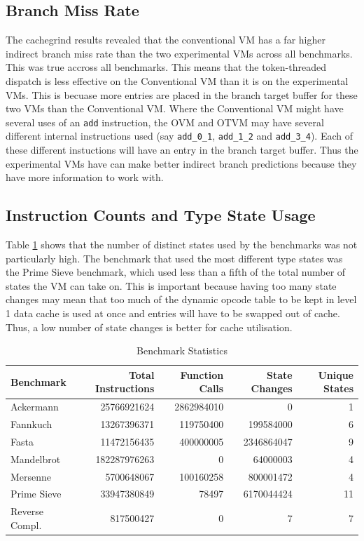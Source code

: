 \documentclass[english,a4paper,12pt]{report}
\begin{document}
\subsection{Branch Miss Rate}
The cachegrind results revealed that the conventional VM has a far
higher indirect branch miss rate than the two experimental VMs across
all benchmarks. This was true accross all benchmarks. This means that
the token-threaded dispatch is less effective on the Conventional VM
than it is on the experimental VMs. This is becuase more entries are
placed in the branch target buffer for these two VMs than the
Conventional VM. Where the Conventional VM might have several uses of
an \verb|add| instruction, the OVM and OTVM may have several different
internal instructions used (say \verb|add_0_1|, \verb|add_1_2| and
\verb|add_3_4|). Each of these different instuctions will have an
entry in the branch target buffer. Thus the experimental VMs have can
make better indirect branch predictions because they have more
information to work with.

\subsection{Instruction Counts and Type State Usage}
Table \ref{tab:stats} shows that the number of distinct states used by
the benchmarks was not particularly high. The benchmark that used the
most different type states was the Prime Sieve benchmark, which used
less than a fifth of the total number of states the VM can take
on. This is important because having too many state changes may mean
that too much of the dynamic opcode table to be kept in level 1 data
cache is used at once and entries will have to be swapped out of
cache. Thus, a low number of state changes is better for cache
utilisation.

\begin{table}[!htb]
  \centering
  \begin{center}
    \begin{tabular}{lrrrr}
      Benchmark & Total Instructions & Function Calls & State Changes & Unique States\\
      \hline
      Ackermann & 25766921624 & 2862984010 & 0 & 1\\
      Fannkuch & 13267396371 & 119750400 & 199584000 & 6\\
      Fasta & 11472156435 & 400000005 & 2346864047 & 9\\
      Mandelbrot & 182287976263 & 0 & 64000003 & 4\\
      Mersenne & 5700648067 & 100160258 & 800001472 & 4\\
      Prime Sieve & 33947380849 & 78497 & 6170044424 & 11\\
      Reverse Compl. & 817500427 & 0 & 7 & 7\\
    \end{tabular}
  \end{center}
  \caption{Benchmark Statistics}
  \label{tab:stats}
\end{table}
\end{document}
